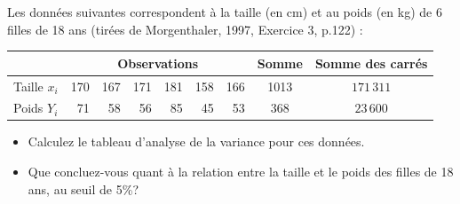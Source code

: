 \item Les données suivantes correspondent à la taille (en cm) et au poids (en kg) de 6 filles de 18 ans (tirées de Morgenthaler, 1997, Exercice 3, p.122) :

\begin{center}
\begin{tabular}{|l|rrrrrr|c|c|}
\hline
&\multicolumn{6}{|c|}{Observations}&Somme & Somme des carrés\\\hline
Taille $x_i$ & 170 & 167 & 171 & 181 & 158 & 166 &1013&$171\,311$\\\hline
Poids $Y_i$ & 71 & 58 & 56 & 85 & 45 & 53&368&$23\,600$\\\hline
\end{tabular}
\end{center}

\begin{itemize}
\item[a)] Calculez le tableau d'analyse de la variance pour ces données. %
\vspace{0.1 in}
\item[b)] Que concluez-vous quant à la relation entre la taille et le poids des filles de 18 ans, au seuil de 5\%?
\end{itemize}

